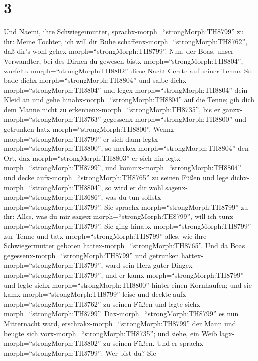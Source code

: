 \hypertarget{section-2}{%
\section{3}\label{section-2}}

 Und Naemi, ihre Schwiegermutter,
sprachx-morph=``strongMorph:TH8799'' zu ihr: Meine Tochter, ich will dir
Ruhe schaffenx-morph=``strongMorph:TH8762'', daß dir's wohl
gehex-morph=``strongMorph:TH8799''.  Nun, der Boas, unser
Verwandter, bei des Dirnen du gewesen
bistx-morph=``strongMorph:TH8804'',
worfeltx-morph=``strongMorph:TH8802'' diese Nacht Gerste auf seiner
Tenne.  So bade dichx-morph=``strongMorph:TH8804'' und salbe
dichx-morph=``strongMorph:TH8804'' und
legex-morph=``strongMorph:TH8804'' dein Kleid an und gehe
hinabx-morph=``strongMorph:TH8804'' auf die Tenne; gib dich dem Manne
nicht zu erkennenx-morph=``strongMorph:TH8735'', bis er
ganzx-morph=``strongMorph:TH8763''
gegessenx-morph=``strongMorph:TH8800'' und getrunken
hatx-morph=``strongMorph:TH8800''. 
Wennx-morph=``strongMorph:TH8799'' er sich dann
legtx-morph=``strongMorph:TH8800'', so
merkex-morph=``strongMorph:TH8804'' den Ort,
dax-morph=``strongMorph:TH8803'' er sich hin
legtx-morph=``strongMorph:TH8799'', und
kommx-morph=``strongMorph:TH8804'' und decke
aufx-morph=``strongMorph:TH8765'' zu seinen Füßen und lege
dichx-morph=``strongMorph:TH8804'', so wird er dir wohl
sagenx-morph=``strongMorph:TH8686'', was du tun
sollstx-morph=``strongMorph:TH8799''.  Sie
sprachx-morph=``strongMorph:TH8799'' zu ihr: Alles, was du mir
sagstx-morph=``strongMorph:TH8799'', will ich
tunx-morph=``strongMorph:TH8799''.  Sie ging
hinabx-morph=``strongMorph:TH8799'' zur Tenne und
tatx-morph=``strongMorph:TH8799'' alles, wie ihre Schwiegermutter
geboten hattex-morph=``strongMorph:TH8765''.  Und da Boas
gegessenx-morph=``strongMorph:TH8799'' und getrunken
hattex-morph=``strongMorph:TH8799'', ward sein Herz guter
Dingex-morph=``strongMorph:TH8799'', und er
kamx-morph=``strongMorph:TH8799'' und legte
sichx-morph=``strongMorph:TH8800'' hinter einen Kornhaufen; und sie
kamx-morph=``strongMorph:TH8799'' leise und deckte
aufx-morph=``strongMorph:TH8762'' zu seinen Füßen und legte
sichx-morph=``strongMorph:TH8799''. 
Dax-morph=``strongMorph:TH8799'' es nun Mitternacht ward,
erschrakx-morph=``strongMorph:TH8799'' der Mann und beugte sich
vorx-morph=``strongMorph:TH8735''; und siehe, ein Weib
lagx-morph=``strongMorph:TH8802'' zu seinen Füßen.  Und er
sprachx-morph=``strongMorph:TH8799'': Wer bist du? Sie
